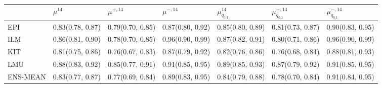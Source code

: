 \begin{tabular}{l p{} p{} p{} p{} p{} p{}}
\toprule
 & $\mu^14$ & $\mu^{+, 14}$ & $\mu^{-, 14}$ & $\mu^14_{q_{0.1}}$ & $\mu^{+, 14}_{q_{0.1}}$ & $\mu^{-, 14}_{q_{0.1}}$ \\
\midrule
EPI & {0.83\newline(0.78, 0.87)} & {0.79\newline(0.70, 0.85)} & {0.87\newline(0.80, 0.92)} & {0.85\newline(0.80, 0.89)} & {0.81\newline(0.73, 0.87)} & {0.90\newline(0.83, 0.95)} \\
ILM & {0.86\newline(0.81, 0.90)} & {0.78\newline(0.70, 0.85)} & {0.96\newline(0.90, 0.99)} & {0.87\newline(0.82, 0.91)} & {0.80\newline(0.71, 0.86)} & {0.96\newline(0.90, 0.99)} \\
KIT & {0.81\newline(0.75, 0.86)} & {0.76\newline(0.67, 0.83)} & {0.87\newline(0.79, 0.92)} & {0.82\newline(0.76, 0.86)} & {0.76\newline(0.68, 0.84)} & {0.88\newline(0.81, 0.93)} \\
LMU & {0.88\newline(0.83, 0.92)} & {0.85\newline(0.77, 0.91)} & {0.91\newline(0.85, 0.95)} & {0.89\newline(0.85, 0.93)} & {0.87\newline(0.79, 0.92)} & {0.91\newline(0.85, 0.95)} \\
ENS-MEAN & {0.83\newline(0.77, 0.87)} & {0.77\newline(0.69, 0.84)} & {0.89\newline(0.83, 0.95)} & {0.84\newline(0.79, 0.88)} & {0.78\newline(0.70, 0.84)} & {0.91\newline(0.84, 0.95)} \\

\end{tabular}
